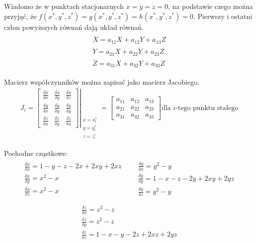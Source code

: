 Wiadomo że w punktach stacjonarnych $\dot{x}= \dot{y} =\dot{z} =0$, na podstawie czego można przyjąć, że $f(x^*,y^*,z^*)=g(x^*,y^*,z^*)=h(x^*,y^*,z^*)=0$. Pierwszy i ostatni człon powyższych równań dają układ równań.
\begin{align}
\begin{array}{c}
\dot{X}=a_{11}X+a_{12}Y+a_{13}Z \\
\dot{Y}=a_{21}X+a_{22}Y+a_{23}Z \\
\dot{Z}=a_{31}X+a_{32}Y+a_{33}Z
\end{array}
\end{align}

Macierz współczynników można zapisać jako macierz Jacobiego.
\begin{align*}
J_i= \left. \left[
\begin{array}{ccc}
\frac{\delta \dot{x}}{\delta x} & \frac{\delta \dot{x}}{\delta y} & \frac{\delta \dot{x}}{\delta z} \\
\frac{\delta \dot{y}}{\delta x} & \frac{\delta \dot{y}}{\delta y} & \frac{\delta \dot{y}}{\delta y} \\
\frac{\delta \dot{z}}{\delta x} & \frac{\delta \dot{z}}{\delta y} & \frac{\delta \dot{z}}{\delta x}
\end{array}
\right]
\right|_{
	\begin{array}{c}
		x=x^*_i\\
		y=y^*_i\\
		z=z^*_i	
	\end{array}	
}
= \left[
\begin{array}{ccc}
a_{11} & a_{12} & a_{13} \\
a_{21} & a_{22} & a_{23} \\
a_{31} & a_{32} & a_{33}
\end{array}
\right] \text{dla }i\text{-tego punktu stałego}
\end{align*}

Pochodne cząstkowe:
\begin{align*}
\begin{array}{l}
\frac{\delta \dot{x}}{\delta x} = 1-y-z-2x+2xy+2xz\\
\frac{\delta \dot{x}}{\delta y} = x^2 - x\\
\frac{\delta \dot{x}}{\delta z} = x^2 - x\\
\end{array}
&&
\begin{array}{l}
\frac{\delta \dot{y}}{\delta x} = y^2 - y\\
\frac{\delta \dot{y}}{\delta y} = 1-x-z-2y+2xy+2yz\\
\frac{\delta \dot{y}}{\delta z} = y^2 - y\\
\end{array}
\end{align*}
\begin{align*}
\begin{array}{l}
\frac{\delta \dot{z}}{\delta x} = z^2 - z\\
\frac{\delta \dot{z}}{\delta y} = z^2 - z\\
\frac{\delta \dot{z}}{\delta z} = 1-x-y-2z+2xz+2yz\\
\end{array}
\end{align*}

